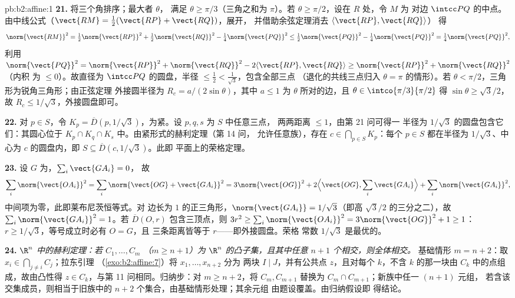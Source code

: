 \begin{solution}{pb:b2:affine:1}
\textbf{21.} 将三个角排序；最大者 $\theta$，
满足 $\theta \geq \pi/3$（三角之和为 $\pi$）。若
$\theta \geq \pi/2$，设在 $R$ 处，令 $M$ 为
对边 $\intcc PQ$ 的中点。由中线公式（$\vect{RM}
= \tfrac12(\vect{RP} + \vect{RQ})$，展开，
并借助余弦定理消去 $\langle\vect{RP}, \vect{RQ}\rangle$）
得
\[
\norm{\vect{RM}}^2 = \tfrac12\norm{\vect{RP}}^2 +
\tfrac12\norm{\vect{RQ}}^2 - \tfrac14\norm{\vect{PQ}}^2 \leq
\tfrac12\norm{\vect{PQ}}^2 - \tfrac14\norm{\vect{PQ}}^2 =
\tfrac14\norm{\vect{PQ}}^2,
\]
利用 $\norm{\vect{PQ}}^2 = \norm{\vect{RP}}^2 +
\norm{\vect{RQ}}^2 - 2\langle\vect{RP}, \vect{RQ}\rangle \geq
\norm{\vect{RP}}^2 + \norm{\vect{RQ}}^2$（内积
为 $\leq 0$）。故直径为 $\intcc PQ$ 的圆盘，半径
$\leq \tfrac12 < \tfrac1{\sqrt3}$，包含全部三点
（退化的共线三点归入 $\theta = \pi$ 的情形）。若
$\theta < \pi/2$，三角形为锐角三角形；由正弦定理
外接圆半径为 $R_c = a/(2\sin\theta)$，其中 $a \leq 1$
为 $\theta$ 所对的边，且 $\theta \in
\intco{\pi/3}{\pi/2}$ 得 $\sin\theta \geq \sqrt3/2$，故
$R_c \leq 1/\sqrt3$，外接圆盘即可。

\textbf{22.} 对 $p \in S$，令 $K_p = \overline D(p,
1/\sqrt3)$，为紧。设 $p, q, s$ 为 $S$ 中任意三点，
两两距离 $\leq 1$，由第 21 问可得一
半径为 $1/\sqrt3$ 的圆盘包含它们：其圆心位于
$K_p \cap K_q \cap K_s$ 中。由紧形式的赫利定理（第 14 问，
允许任意族），存在 $c \in \bigcap_{p\in
S}K_p$：每个 $p \in S$ 都在半径为 $1/\sqrt3$、中心为 $c$ 的圆盘内，即 $S
\subseteq \overline D(c, 1/\sqrt3)$。此即
平面上的荣格定理。

\textbf{23.} 设 $G$ 为，$\sum_i\vect{GA_i} = 0$，
故
\[
\sum_i\norm{\vect{OA_i}}^2 = \sum_i\norm{\vect{OG} +
\vect{GA_i}}^2 = 3\norm{\vect{OG}}^2 + 2\Bigl\langle
\vect{OG}, \sum_i\vect{GA_i}\Bigr\rangle +
\sum_i\norm{\vect{GA_i}}^2,
\]
中间项为零，此即莱布尼茨恒等式。对
边长为 $1$ 的正三角形，$\norm{\vect{GA_i}} =
1/\sqrt3$（即高 $\sqrt3/2$ 的三分之二），故
$\sum_i\norm{\vect{GA_i}}^2 = 1$。若 $\overline D(O, r)$
包含三顶点，则 $3r^2 \geq
\sum_i\norm{\vect{OA_i}}^2 = 3\norm{\vect{OG}}^2 + 1 \geq 1$：
$r \geq 1/\sqrt3$，等号成立时必有 $O = G$，且
三条距离皆等于 $r$——即外接圆盘。荣格
常数 $1/\sqrt3$ 是最优的。

\textbf{24.} \emph{$\R^n$ 中的赫利定理：若 $C_1, \dots, C_m$
（$m \geq n + 1$）为 $\R^n$ 的凸子集，且其中任意 $n + 1$
个相交，则全体相交。} 基础情形 $m = n +
2$：取 $x_i \in \bigcap_{j\neq i}C_j$；拉东引理
（\cref{exo:b2:affine:7}）将 $x_1, \dots, x_{n+2}$ 分为
两块 $I \mid J$，并有公共点 $z$，且对每个
$k$，不含 $k$ 的那一块由
$C_k$ 中的点组成，故由凸性得 $z \in C_k$，与第
11 问相同。归纳步：对 $m \geq n + 2$，将 $C_m,
C_{m+1}$ 替换为 $C_m \cap C_{m+1}$；新族中任一 $(n+1)$ 元组，
若含该交集成员，则相当于旧族中的 $n + 2$
个集合，由基础情形处理；其余元组
由题设覆盖。由归纳假设即
得结论。


\end{solution}
